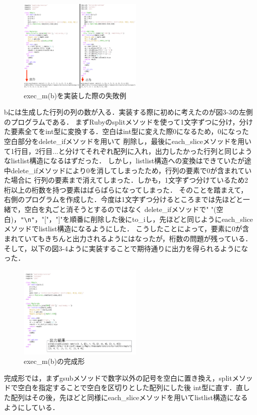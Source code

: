 \begin{figure}[htbp]\begin{center}
\includegraphics[width=6cm,bb=0 0 442 500]{../figs/./mapleruby_eringi.005.png}
\caption{exec\_m(b)を実装した際の失敗例}
\label{default}\end{center}\end{figure}
bには生成した行列の列の数が入る．実装する際に初めに考えたのが図3-3の左側のプログラムである．
まずRubyのsplitメソッドを使って1文字ずつに分け，分けた要素全てをint型に変換する．空白はint型に変えた際0になるため，0になった空白部分をdelete\_ifメソッドを用いて
削除し，最後にeach\_sliceメソッドを用いて1行目，2行目...と分けてそれぞれ配列に入れ，出力したかった行列と同じようなlistlist構造になるはずだった．
しかし，listlist構造への変換はできていたが途中delete\_ifメソッドにより0を消してしまったため，行列の要素で0が含まれていた場合に
行列の要素まで消えてしまった．しかも，1文字ずつ分けているため2桁以上の桁数を持つ要素はばらばらになってしまった．
そのことを踏まえて，右側のプログラムを作成した．今度は1文字ずつ分けるところまでは先ほどと一緒で，空白を丸ごと消そうとするのではなく
delete\_ifメソッドで" "(空白)，\verb|"\n"|，"["，"]"を順番に削除した後にto\_iし，先ほどと同じようにeach\_sliceメソッドでlistlist構造になるようにした．
こうしたことによって，要素に0が含まれていてもきちんと出力されるようにはなったが，桁数の問題が残っている．
そして，以下の図3-4ように実装することで期待通りに出力を得られるようになった．

\begin{figure}[htbp]\begin{center}
\includegraphics[width=6cm,bb=0 0 442 500]{../figs/./mapleruby_eringi.006.png}
\caption{exec\_m(b)の完成形}
\label{default}\end{center}\end{figure}
完成形では，まずgsubメソッドで数字以外の記号を空白に置き換え，splitメソッドで空白を指定することで空白を区切りとした配列にした後
int型に直す．直した配列はその後，先ほどと同様にeach\_sliceメソッドを用いてlistlist構造になるようにしている．

